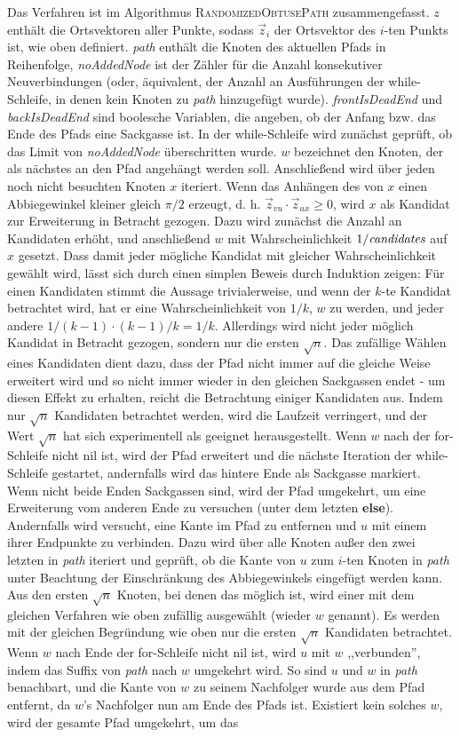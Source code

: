 \documentclass[a4paper, 10pt, ngerman]{article}
\begin{document}
Das Verfahren ist im Algorithmus \textsc{RandomizedObtusePath} zusammengefasst. $z$ enthält die Ortsvektoren aller Punkte, sodass $\vec z_i$ der Ortsvektor des $i$-ten Punkts ist, wie oben definiert. \emph{path} enthält die Knoten des aktuellen Pfads in Reihenfolge, \emph{noAddedNode} ist der Zähler für die Anzahl konsekutiver Neuverbindungen (oder, äquivalent, der Anzahl an Ausführungen der while-Schleife, in denen kein Knoten zu \emph{path} hinzugefügt wurde). \emph{frontIsDeadEnd} und \emph{backIsDeadEnd} sind boolesche Variablen, die angeben, ob der Anfang bzw. das Ende des Pfads eine Sackgasse ist. In der while-Schleife wird zunächst geprüft, ob das Limit von \emph{noAddedNode} überschritten wurde.  $w$ bezeichnet den Knoten, der als nächstes an den Pfad angehängt werden soll. Anschließend wird über jeden noch nicht besuchten Knoten $x$ iteriert. Wenn das Anhängen des von $x$ einen Abbiegewinkel kleiner gleich $\pi / 2$ erzeugt, d. h. $\vec z_{vu} \cdot \vec z_{ux} \ge 0$, wird $x$ als Kandidat zur Erweiterung in Betracht gezogen. Dazu wird zunächst die Anzahl an Kandidaten erhöht, und anschließend $w$ mit Wahrscheinlichkeit $1 / \emph{candidates}$ auf $x$ gesetzt. Dass damit jeder mögliche Kandidat mit gleicher Wahrscheinlichkeit gewählt wird, lässt sich durch einen simplen Beweis durch Induktion zeigen: Für einen Kandidaten stimmt die Aussage trivialerweise, und wenn der $k$-te Kandidat betrachtet wird, hat er eine Wahrscheinlichkeit von $1/k$, $w$ zu werden, und jeder andere $1/(k-1) \cdot (k - 1) / k = 1 / k$. Allerdings wird nicht jeder möglich Kandidat in Betracht gezogen, sondern nur die ersten $\sqrt n$. Das zufällige Wählen eines Kandidaten dient dazu, dass der Pfad nicht immer auf die gleiche Weise erweitert wird und so nicht immer wieder in den gleichen Sackgassen endet - um diesen Effekt zu erhalten, reicht die Betrachtung einiger Kandidaten aus. Indem nur $\sqrt n$ Kandidaten betrachtet werden, wird die Laufzeit verringert, und der Wert $\sqrt n$ hat sich experimentell als geeignet herausgestellt. Wenn $w$ nach der for-Schleife nicht nil ist, wird der Pfad erweitert und die nächste Iteration der while-Schleife gestartet, andernfalls wird das hintere Ende als Sackgasse markiert. Wenn nicht beide Enden Sackgassen sind, wird der Pfad umgekehrt, um eine Erweiterung vom anderen Ende zu versuchen (unter dem letzten \textbf{else}). Andernfalls wird versucht, eine Kante im Pfad zu entfernen und $u$ mit einem ihrer Endpunkte zu verbinden. Dazu wird über alle Knoten außer den zwei letzten in \emph{path} iteriert und geprüft, ob die Kante von $u$ zum $i$-ten Knoten in \emph{path} unter Beachtung der Einschränkung des Abbiegewinkels eingefügt werden kann. Aus den ersten $\sqrt n$ Knoten, bei denen das möglich ist, wird einer mit dem gleichen Verfahren wie oben zufällig ausgewählt (wieder $w$ genannt). Es werden mit der gleichen Begründung wie oben nur die ersten $\sqrt n$ Kandidaten betrachtet. Wenn $w$ nach Ende der for-Schleife nicht nil ist, wird $u$ mit $w$ ,,verbunden'', indem das Suffix von \emph{path} nach $w$ umgekehrt wird. So sind $u$ und $w$ in \emph{path} benachbart, und die Kante von $w$ zu seinem Nachfolger wurde aus dem Pfad entfernt, da $w$'s Nachfolger nun am Ende des Pfads ist. Existiert kein solches $w$, wird der gesamte Pfad umgekehrt, um das 
\end{document}
